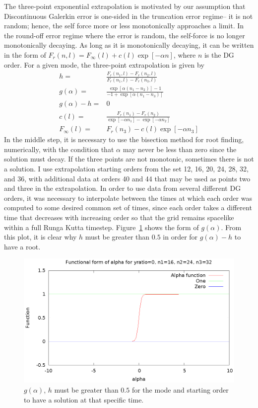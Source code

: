 The three-point exponential extrapolation is motivated by our assumption that Discontinuous Galerkin error is one-sided in the truncation error regime-- it is not random; hence, the self force more or less monotonically approaches a limit. In the round-off error regime where the error is random, the self-force is no longer monotonically decaying. As long as it is monotonically decaying, it can be written in the form of $F_r(n,l)=F_\infty(l)+c(l)\exp[-\alpha n]$, where $n$ is the DG order. For a given mode, the three-point extrapolation is given by
\begin{eqnarray}
h=&\frac{F_r(n_1,l)-F_r(n_2,l)}{F_r(n_1,l)-F_r(n_3,l)}\\
g(\alpha)=&\frac{\exp[\alpha(n_1-n_2)]-1}{-1+\exp[\alpha(n_1-n_3)]}\\
g(\alpha)-h=&0\\
c(l)=&\frac{F_r(n_1)-F_r(n_2)}{\exp[-\alpha n_1]-\exp[-\alpha n_2]}\\
F_\infty(l)=&F_r(n_3)-c(l)\exp[-\alpha n_3]
\end{eqnarray}
In the middle step, it is necessary to use the bisection method for root finding, numerically, with the condition that $\alpha$ may never be less than zero since the solution must decay. If the three points are not monotonic, sometimes there is not a solution. I use extrapolation starting orders from the set 12, 16, 20, 24, 28, 32, and 36, with additional data at orders 40 and 44 that may be used as points two and three in the extrapolation. In order to use data from several different DG orders, it was necessary to interpolate between the times at which each order was computed to some desired common set of times, since each order takes a different time that decreases with increasing order so that the grid remains spacelike within a full Runga Kutta timestep. Figure~\ref{galpha} shows the form of $g(\alpha)$. From this plot, it is clear why $h$ must be greater than $0.5$ in order for $g(\alpha)-h$ to have a root. 


\begin{figure}
  \includegraphics{alphafunction}
  \caption{$g(\alpha)$, $h$ must be greater than $0.5$ for the mode and starting order to have a solution at that specific time.}
  \label{galpha}
\end{figure}



